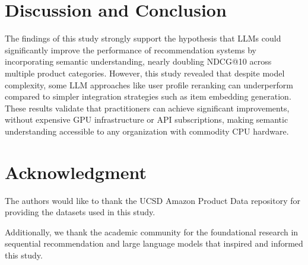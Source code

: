 \documentclass[conference]{IEEEtran}
\begin{document}
\section{Discussion and Conclusion}

The findings of this study strongly support the hypothesis that LLMs could significantly improve the performance of recommendation systems by incorporating semantic understanding, nearly doubling NDCG@10 across multiple product categories. However, this study revealed that despite model complexity, some LLM approaches like user profile reranking can underperform compared to simpler integration strategies such as item embedding generation. These results validate that practitioners can achieve significant improvements, without expensive GPU infrastructure or API subscriptions, making semantic understanding accessible to any organization with commodity CPU hardware.


\section*{Acknowledgment}

The authors would like to thank the UCSD Amazon Product Data repository for providing the datasets used in this study.

Additionally, we thank the academic community for the foundational research in sequential recommendation and large language models that inspired and informed this study.


 

\end{document}
